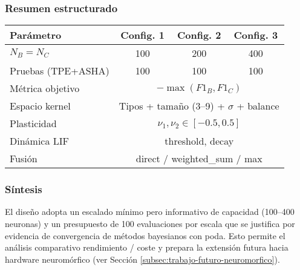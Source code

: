 \subsubsection{Resumen estructurado}
\begin{center}
\begin{tabular}{lccc}
\hline
Parámetro & Config. 1 & Config. 2 & Config. 3 \\
\hline
$N_B = N_C$ & 100 & 200 & 400 \\
Pruebas (TPE+ASHA) & 100 & 100 & 100 \\
Métrica objetivo & \multicolumn{3}{c}{$-\max(F1_B,F1_C)$} \\
Espacio kernel & \multicolumn{3}{c}{Tipos + tamaño (3--9) + $\sigma$ + balance} \\
Plasticidad & \multicolumn{3}{c}{$\nu_1,\nu_2 \in [-0.5,0.5]$} \\
Dinámica LIF & \multicolumn{3}{c}{threshold, decay} \\
Fusión & \multicolumn{3}{c}{direct / weighted\_sum / max} \\
\hline
\end{tabular}
\end{center}

\subsubsection{Síntesis}
El diseño adopta un escalado mínimo pero informativo de capacidad (100–400 neuronas) y un presupuesto de 100 evaluaciones por escala que se justifica por evidencia de convergencia de métodos bayesianos con poda. Esto permite el análisis comparativo rendimiento / coste y prepara la extensión futura hacia hardware neuromórfico (ver Sección \ref{subsec:trabajo-futuro-neuromorfico}).



